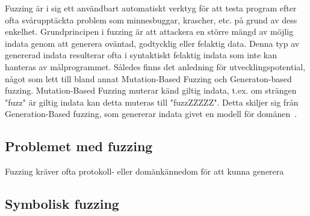 Fuzzing är i sig ett användbart automatiskt verktyg för att testa program efter
ofta svårupptäckta problem som minnesbuggar, krascher, etc. på grund av dess
enkelhet. Grundprincipen i fuzzing är att attackera en större mängd av möjlig
indata genom att generera oväntad, godtycklig eller felaktig data. Denna typ
av genererad indata resulterar ofta i syntaktiskt felaktig indata som inte kan
hanteras av målprogrammet. Således finns det anledning för utvecklingspotential,
något som lett till bland annat Mutation-Based Fuzzing och Generaton-based
fuzzing. Mutation-Based Fuzzing muterar känd giltig indata, t.ex. om strängen
"fuzz" är giltig indata kan detta muteras till "fuzzZZZZZ". Detta skiljer sig från
Generation-Based fuzzing, som genererar indata givet en modell för
domänen~\cite{fuzzing}.

\subsection{Problemet med fuzzing}
Fuzzing kräver ofta protokoll- eller domänkännedom för att kunna generera 

\subsection{Symbolisk fuzzing}






